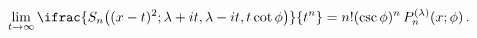 \[\lim_{t\to\infty}\ifrac{\mathop{S_{n}\/}\nolimits\!\left((x-t)^{2};\lambda+it,%
\lambda-it,t\mathop{\cot\/}\nolimits\phi\right)}{t^{n}}=n!(\mathop{\csc\/}%
\nolimits\phi)^{n}\mathop{P^{(\lambda)}_{n}\/}\nolimits\!\left(x;\phi\right).\]